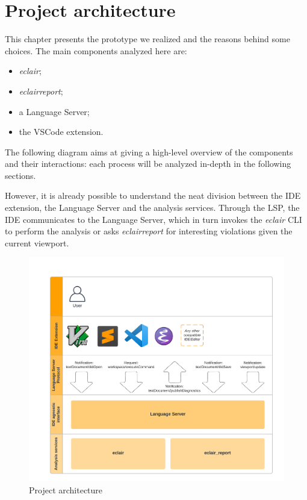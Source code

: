 \chapter{Project architecture}\label{chapter:project-architecture}
This chapter presents the prototype we realized and the reasons behind some choices. The main components analyzed here are:
\begin{itemize}
  \item \emph{eclair};
  \item \emph{eclair\textunderscore	report};
  \item a Language Server;
  \item the VSCode extension.
\end{itemize}
The following diagram aims at giving a high-level overview of the components and their interactions: each process will be analyzed in-depth in the following sections. 

However, it is already possible to understand the neat division between the IDE extension, the Language Server and the analysis services. Through the LSP, the IDE communicates to the Language Server, which in turn invokes the \emph{eclair} CLI to perform the analysis or asks \emph{eclair\textunderscore	report} for interesting violations given the current viewport.

\begin{figure}[ht]
	\centering
	\includegraphics[width=1\textwidth]{Immagini/project_architecture.jpg}
	\caption{Project architecture}
	\label{fig:one}
\end{figure}

